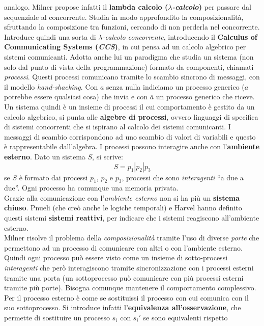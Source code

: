 \documentclass[a4paper,12pt, oneside]{book}
\begin{document}
analogo. Milner propose infatti il \textbf{lambda calcolo
  (\textit{$\lambda$-calcolo})} per passare dal sequenziale al
concorrente. Studia in modo approfondito la composizionalità, sfruttando la
composizione tra funzioni, cercando di non perderla nel concorrente. Introduce
quindi una sorta di \textit{$\lambda$-calcolo concorrente}, introducendo il
\textbf{Calculus of Communicating Systems (\textit{CCS})}, in cui pensa ad un
calcolo algebrico per sistemi comunicanti. Adotta anche lui un paradigma che
studia un sistema (non solo dal punto di vista della programmazione) formato da
componenti, chiamati \textit{processi}. Questi processi comunicano tramite lo
scambio sincrono di messaggi, con il modello \textit{hand-shacking}. Con $a$
senza nulla indiciamo un processo generico ($a$ potrebbe essere qualsiasi cosa)
che invia e con $\overline{a}$ un processo generico che riceve.
Un sistema quindi è un insieme di processi il cui comportamento è gestito da un
calcolo algebrico, si punta alle \textbf{algebre di processi}, ovvero
linguaggi di specifica di sistemi concorrenti che si ispirano al calcolo dei
sistemi comunicanti. I messaggi di scambio corrispondono ad uno scambio di
valori di variabili e questo è rappresentabile dall'algebra. I processi possono
interagire anche con l'\textbf{ambiente esterno}. Dato un sistema $S$, si
scrive:
\[S=p_1|p_2|p_3\]
se $S$ è formato dai processi $p_1$, $p_2$ e $p_3$, processi che sono
\textit{interagenti} ``a due a due''. Ogni processo ha comunque una memoria
privata.\\ 
Grazie alla comunicazione con l'\textit{ambiente esterno} non si ha più un
\textbf{sistema chiuso}. Pnueli (che creò anche le logiche temporali) e Harvel
hanno definito questi sistemi \textbf{sistemi reattivi}, per indicare che i
sistemi reagiscono all'ambiente esterno.\\
Milner risolve il problema della \textit{composizionalità} tramite l'uso di
diverse \textit{porte} che permettono ad un processo di comunicare con altri o
con l'ambiente esterno. Quindi ogni processo può essere visto come un insieme di
sotto-processi \textit{interagenti} che però interagiscono tramite
sincronizzazione con i processi esterni tramite una porta (un sottoprocesso può
comunicare con più processi esterni tramite più porte). Bisogna comunque
mantenere il comportamento complessivo. Per il processo esterno è come se
sostituissi il processo con cui comunica con il suo sottoprocesso. Si introduce
infatti l'\textbf{equivalenza all'osservazione}, che permette di sostituire un
processo $s_i$ con $s_i'$ se sono equivalenti rispetto
\end{document}

